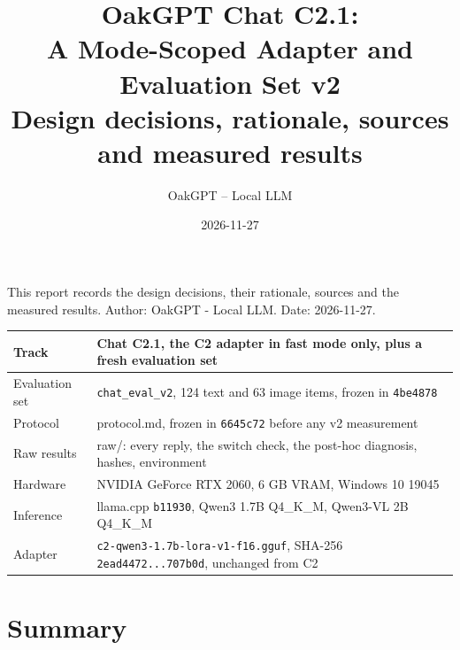 \documentclass[11pt,a4paper]{article}
\title{\textbf{OakGPT Chat C2.1:\\A Mode-Scoped Adapter and Evaluation Set v2}\\[4pt]
  \large Design decisions, rationale, sources and measured results}
\author{OakGPT -- Local LLM}
\date{2026-11-27}
\newcommand{\code}[1]{\texttt{#1}}
\begin{document}
\maketitle


This report records the design decisions, their rationale, sources and the measured results. Author: OakGPT - Local LLM. Date: 2026-11-27.

\begin{table}[H]\centering\small
\begin{tabularx}{\textwidth}{@{}lY@{}}
\toprule
Track & Chat C2.1, the C2 adapter in fast mode only, plus a fresh evaluation set \\
\midrule
Evaluation set & \code{chat\_eval\_v2}, 124 text and 63 image items, frozen in \code{4be4878} \\
Protocol & protocol.md, frozen in \code{6645c72} before any v2 measurement \\
Raw results & raw/: every reply, the switch check, the post-hoc diagnosis, hashes, environment \\
Hardware & NVIDIA GeForce RTX 2060, 6 GB VRAM, Windows 10 19045 \\
Inference & llama.cpp \code{b11930}, Qwen3 1.7B Q4\_K\_M, Qwen3-VL 2B Q4\_K\_M \\
Adapter & \code{c2-qwen3-1.7b-lora-v1-f16.gguf}, SHA-256 \code{2ead4472...707b0d}, unchanged from C2 \\
\bottomrule\end{tabularx}\end{table}

\section{Summary}
\end{document}
